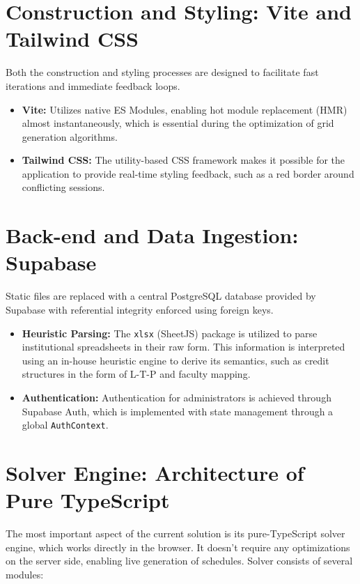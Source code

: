 \section{Construction and Styling: Vite and Tailwind CSS}

Both the construction and styling processes are designed to facilitate fast iterations and immediate feedback loops.
\begin{itemize}
    \item \textbf{Vite:} Utilizes native ES Modules, enabling hot module replacement (HMR) almost instantaneously, which is essential during the optimization of grid generation algorithms.
    \item \textbf{Tailwind CSS:} The utility-based CSS framework makes it possible for the application to provide real-time styling feedback, such as a red border around conflicting sessions.
\end{itemize}

\section{Back-end and Data Ingestion: Supabase}

Static files are replaced with a central PostgreSQL database provided by Supabase with referential integrity enforced using foreign keys.
\begin{itemize}
    \item \textbf{Heuristic Parsing:} The \texttt{xlsx} (SheetJS) package is utilized to parse institutional spreadsheets in their raw form. This information is interpreted using an in-house heuristic engine to derive its semantics, such as credit structures in the form of L-T-P and faculty mapping.
    \item \textbf{Authentication:} Authentication for administrators is achieved through Supabase Auth, which is implemented with state management through a global \texttt{AuthContext}.
\end{itemize}

\section{Solver Engine: Architecture of Pure TypeScript}

The most important aspect of the current solution is its pure-TypeScript solver engine, which works directly in the browser. It doesn’t require any optimizations on the server side, enabling live generation of schedules. Solver consists of several modules:

